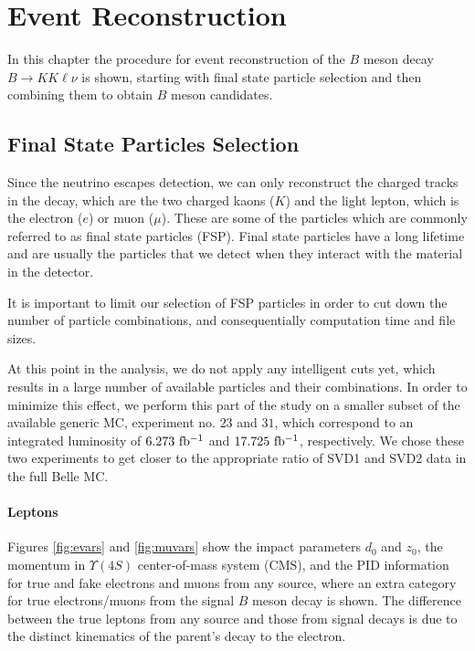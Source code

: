 \chapter{Event Reconstruction}

In this chapter the procedure for event reconstruction of the $B$ meson decay $B \to K K \ell \nu$ is shown, starting with final state particle selection and then combining them to obtain $B$ meson candidates.

\section{Final State Particles Selection}
Since the neutrino escapes detection, we can only reconstruct the charged tracks in the decay, which are the two charged kaons ($K$) and the light lepton, which is the electron ($e$) or muon ($\mu$). These are some of the particles which are commonly referred to as final state particles (FSP). Final state particles have a long lifetime and are usually the particles that we detect when they interact with the material in the detector.

It is important to limit our selection of FSP particles in order to cut down the number of particle combinations, and consequentially computation time and file sizes.

At this point in the analysis, we do not apply any intelligent cuts yet, which results in a large number of available particles and their combinations. In order to minimize this effect, we perform this part of the study on a smaller subset of the available generic MC, experiment no. $23$ and $31$, which correspond to an integrated luminosity of $6.273\mathrm{~fb^{-1}}$ and $17.725\mathrm{~fb^{-1}}$, respectively. We chose these two experiments to get closer to the appropriate ratio of SVD1 and SVD2 data in the full Belle MC.

\subsubsection{Leptons}

Figures \ref{fig:evars} and \ref{fig:muvars} show the impact parameters $d_0$ and $z_0$, the momentum in  $\Upsilon(4S)$ center-of-mass system (CMS), and the PID information for true and fake electrons and muons from any source, where an extra category for true electrons/muons from the signal $B$ meson decay is shown. The difference between the true leptons from any source and those from signal decays is due to the distinct kinematics of the parent's decay to the electron.

